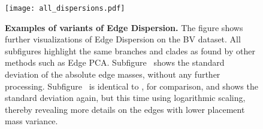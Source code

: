 
\begin{figure}[!htpb]
    \centering
    \texttt{[image: all\_dispersions.pdf]}
    \begin{subfigure}{0pt}
        \label{fig:all_dispersions:sub:em_var}
    \end{subfigure}
    \begin{subfigure}{0pt}
        \label{fig:all_dispersions:sub:em_varc}
    \end{subfigure}
    \begin{subfigure}{0pt}
        \label{fig:all_dispersions:sub:em_iod}
    \end{subfigure}
    \begin{subfigure}{0pt}
        \label{fig:all_dispersions:sub:ei_var}
    \end{subfigure}
    \caption[Examples of variants of Edge Dispersion]{
        \textbf{Examples of variants of Edge Dispersion.}
        The figure shows further visualizations of Edge Dispersion on the \ac{BV} dataset.
        All subfigures highlight the same branches and clades as found by other methods such as Edge PCA.
        Subfigure~
        shows the standard deviation of the absolute edge masses, without any further processing.
        Subfigure~
        is identical to , for comparison,
        and shows the standard deviation again, but this time using logarithmic scaling,
        thereby revealing more details on the edges with lower placement mass variance.
}
\end{figure}
